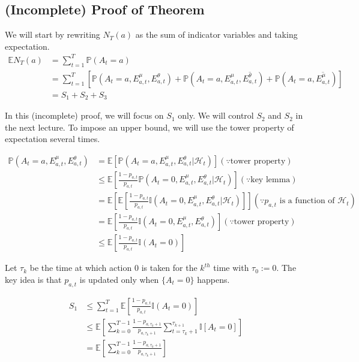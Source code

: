 \documentclass[11pt]{article}
\begin{document}
\subsection{(Incomplete) Proof of Theorem}
We will start by rewriting $N_T(a)$ as the sum of indicator variables
and taking expectation. 
\begin{align*}
    \mathbb{E}N_T(a) &= \sum_{t=1}^T \mathbb{P}(A_t = a) \\
    &= \sum_{t=1}^T [\mathbb{P}(A_t = a, E^\mu_{a, t}, E^\theta_{a, t}) + \mathbb{P}(A_t = a, E^\mu_{a, t}, \overline{E^\theta_{a, t}}) + \mathbb{P}(A_t = a, \overline{E^\mu_{a, t}})] \\
    &= S_1 + S_2 + S_3
\end{align*}

In this (incomplete) proof, we will focus on $S_1$ only. We will control $S_2
$ and $S_2$ in the next lecture. To impose an upper bound, we will use
the tower property of expectation several times. 

\begin{align*}
    \mathbb{P}(A_t = a, E^\mu_{a, t}, E^\theta_{a, t}) &= \mathbb{E}[\mathbb{P}(A_t = a, E^\mu_{a, t}, E^\theta_{a, t}|\mathcal{H}_t)] (\because \text{tower property})\\
    &\leq \mathbb{E}[\frac{1 - p_{a, t}}{p_{a, t}}\mathbb{P}(A_t = 0, E^\mu_{a, t}, E^\theta_{a, t}|\mathcal{H}_t)] (\because \text{key lemma}) \\
    &= \mathbb{E}[\mathbb{E}[\frac{1 - p_{a, t}}{p_{a, t}}\mathbb{I}(A_t = 0, E^\mu_{a, t}, E^\theta_{a, t}|\mathcal{H}_t)]] (\because p_{a,t} \text{ is a function of } \mathcal{H}_t) \\
    &= \mathbb{E}[\frac{1 - p_{a, t}}{p_{a, t}}\mathbb{I}(A_t = 0, E^\mu_{a, t}, E^\theta_{a, t})] (\because \text{tower property})\\
    &\leq \mathbb{E}[\frac{1 - p_{a, t}}{p_{a, t}}\mathbb{I}(A_t = 0)]
\end{align*}

Let $\tau_k$ be the time at which action $0$ is taken for the $k^{th}$ time with $\tau_0 :=0$. The key idea is that $p_{a, t}$ is updated only when $\{A_t = 0\}$ happens. 

\begin{align*}
    S_1 &\leq \sum_{t=1}^T\mathbb{E}[\frac{1 - p_{a, t}}{p_{a, t}}\mathbb{I}(A_t = 0)] \\
    &\leq \mathbb{E}[\sum_{k=0}^{T-1} \frac{1 - p_{a, \tau_k + 1}}{p_{a, \tau_k +1}}\sum_{t=\tau_k +1}^{\tau_{k+1}}\mathbb{I}[A_t = 0]] \\
    &=\mathbb{E}[\sum_{k=0}^{T-1} \frac{1 - p_{a, \tau_k + 1}}{p_{a, \tau_k +1}}]
\end{align*}
\end{document}
